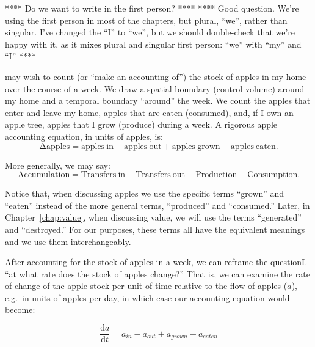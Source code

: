 **** Do we want to write in the first person? ****
**** Good question. We're using the first person
in most of the chapters, but plural, ``we'', rather than
singular. I've changed the ``I'' to ``we'', but we should
double-check that we're happy with it, as it mixes
plural and singular first person: ``we'' with ``my'' and
``I'' ****

may wish to count (or ``make an accounting of'') 
the stock of apples in my home over the course of a week. 
We draw a spatial boundary (control volume) around my home 
and a temporal boundary ``around'' the week.
We count the apples that enter and leave my home, 
apples that are eaten (consumed),
and, if I own an apple tree, apples that I grow (produce) during a week. 
A rigorous apple accounting equation, in units of apples, is:
\begin{equation}
	\mathrm{\Delta}\mathrm{apples} 
	= \mathrm{apples~in} 
	- \mathrm{apples~out} 
	+ \mathrm{apples~grown} 
	- \mathrm{apples~eaten}.
\end{equation}

\noindent{}More generally, we may say:
\begin{equation}
	\mathrm{Accumulation}
	= \mathrm{Transfers~in} 
	- \mathrm{Transfers~out}
	+ \mathrm{Production}
	- \mathrm{Consumption}.
\end{equation}

Notice that, when discussing apples we use the specific terms ``grown'' and
``eaten'' instead of the more general terms, ``produced'' and ``consumed.''
Later, in Chapter~\ref{chap:value}, when discussing value, we will use the terms
``generated'' and ``destroyed.'' For our purposes, these terms all have the equivalent
meanings and we use them interchangeably.

After accounting for the stock of apples in a week,
we can reframe the questionL ``at what rate does the stock of
apples change?'' That is, we can examine the rate of
change of the apple stock per unit of time relative to the flow of apples 
($\dot{a}$), 
e.g.\ in units of apples per day, 
in which case our accounting equation would become:

\begin{equation} \label{eq:apple_rate_accounting}
	\frac{\mathrm{d}a}{\mathrm{d}t}
	= \dot{a}_{in}
	- \dot{a}_{out}
	+ \dot{a}_{grown}
	- \dot{a}_{eaten}
\end{equation}

